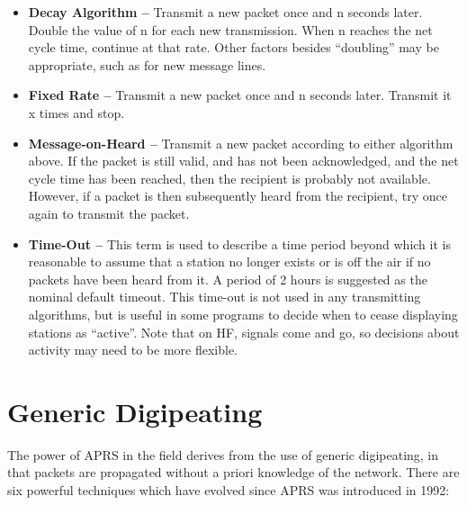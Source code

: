 \documentclass{scrreprt}[letter]
\begin{document}
\begin{itemize}


\item \textbf{Decay Algorithm --} Transmit a new packet once and n seconds later.
Double the value of n for each new transmission. When n reaches the
net cycle time, continue at that rate. Other factors besides
“doubling” may be appropriate, such as for new message lines.

\item \textbf{Fixed Rate --} Transmit a new packet once and n seconds later. Transmit
it x times and stop.

\item \textbf{Message-on-Heard --} Transmit a new packet according to either
algorithm above. If the packet is still valid, and has not been
acknowledged, and the net cycle time has been reached, then the
recipient is probably not available. However, if a packet is then
subsequently heard from the recipient, try once again to transmit the
packet.

\item \textbf{Time-Out --} This term is used to describe a time period beyond which it
is reasonable to assume that a station no longer exists or is off the air if
no packets have been heard from it. A period of 2 hours is suggested as
the nominal default timeout. This time-out is not used in any transmitting
algorithms, but is useful in some programs to decide when to cease
displaying stations as “active”. Note that on HF, signals come and go, so
decisions about activity may need to be more flexible.


\end{itemize}

\section{Generic Digipeating}


The power of APRS in the field derives from the use of generic digipeating,
in that packets are propagated without a priori knowledge of the network.
There are six powerful techniques which have evolved since APRS was
introduced in 1992:
\end{document}

